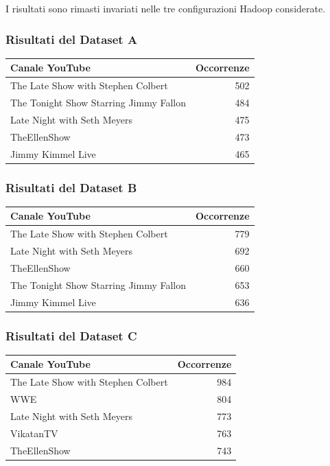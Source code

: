 \documentclass[12pt, a4paper]{article}
\begin{document}
I risultati sono rimasti invariati nelle
tre configurazioni Hadoop considerate.

\subsubsection{Risultati del Dataset A}

\begin{center}
\begin{tabular}{|l|r|}
\hline
\textbf{Canale YouTube} & \textbf{Occorrenze} \\
\hline
The Late Show with Stephen Colbert & 502 \\
The Tonight Show Starring Jimmy Fallon & 484 \\
Late Night with Seth Meyers & 475 \\
TheEllenShow & 473 \\
Jimmy Kimmel Live & 465 \\
\hline
\end{tabular}
\end{center}

\subsubsection{Risultati del Dataset B}

\begin{center}
\begin{tabular}{|l|r|}
\hline
\textbf{Canale YouTube} & \textbf{Occorrenze} \\
\hline
The Late Show with Stephen Colbert & 779 \\
Late Night with Seth Meyers & 692 \\
TheEllenShow & 660 \\
The Tonight Show Starring Jimmy Fallon & 653 \\
Jimmy Kimmel Live & 636 \\
\hline
\end{tabular}
\end{center}

\subsubsection{Risultati del Dataset C}

\begin{center}
\begin{tabular}{|l|r|}
\hline
\textbf{Canale YouTube} & \textbf{Occorrenze} \\
\hline
The Late Show with Stephen Colbert & 984 \\
WWE & 804 \\
Late Night with Seth Meyers & 773 \\
VikatanTV & 763 \\
TheEllenShow & 743 \\
\hline
\end{tabular}
\end{center}
\end{document}
